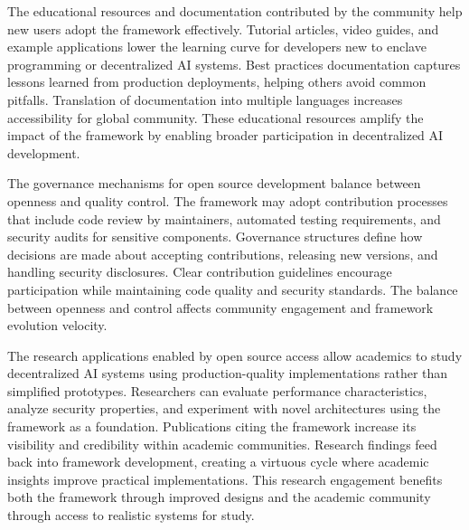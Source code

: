 The educational resources and documentation contributed by the community help new users adopt the framework effectively. Tutorial articles, video guides, and example applications lower the learning curve for developers new to enclave programming or decentralized AI systems. Best practices documentation captures lessons learned from production deployments, helping others avoid common pitfalls. Translation of documentation into multiple languages increases accessibility for global community. These educational resources amplify the impact of the framework by enabling broader participation in decentralized AI development.

The governance mechanisms for open source development balance between openness and quality control. The framework may adopt contribution processes that include code review by maintainers, automated testing requirements, and security audits for sensitive components. Governance structures define how decisions are made about accepting contributions, releasing new versions, and handling security disclosures. Clear contribution guidelines encourage participation while maintaining code quality and security standards. The balance between openness and control affects community engagement and framework evolution velocity.

The research applications enabled by open source access allow academics to study decentralized AI systems using production-quality implementations rather than simplified prototypes. Researchers can evaluate performance characteristics, analyze security properties, and experiment with novel architectures using the framework as a foundation. Publications citing the framework increase its visibility and credibility within academic communities. Research findings feed back into framework development, creating a virtuous cycle where academic insights improve practical implementations. This research engagement benefits both the framework through improved designs and the academic community through access to realistic systems for study.
